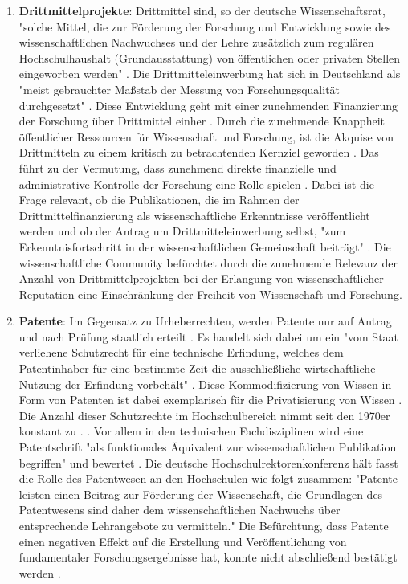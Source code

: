 \begin{enumerate}
\item \textbf{Drittmittelprojekte}: Drittmittel sind, so der deutsche Wissenschaftsrat, "solche Mittel, die zur Förderung der Forschung und Entwicklung sowie des wissenschaftlichen Nachwuchses und der Lehre zusätzlich zum regulären Hochschulhaushalt (Grundausstattung) von öffentlichen oder privaten Stellen eingeworben werden" \cite{wr_2014}. Die Drittmitteleinwerbung hat sich in Deutschland als "meist gebrauchter Maßstab der Messung von Forschungsqualität durchgesetzt" \cite{M_nch_2006}. Diese Entwicklung geht mit einer zunehmenden Finanzierung der Forschung über Drittmittel einher \cite{Neidhardt_2010} \cite{Jansen_2007} \cite{simon_2009_wissenschaft_governance}. Durch die zunehmende Knappheit öffentlicher Ressourcen für Wissenschaft und Forschung, ist die Akquise von Drittmitteln zu einem kritisch zu betrachtenden Kernziel geworden \cite{Jansen_2007}. Das führt zu der Vermutung, dass zunehmend direkte finanzielle und administrative Kontrolle der Forschung eine Rolle spielen \cite{Barl_sius_2008}. Dabei ist die Frage relevant, ob die Publikationen, die im Rahmen der Drittmittelfinanzierung als wissenschaftliche Erkenntnisse veröffentlicht werden und ob der Antrag um Drittmitteleinwerbung selbst, "zum Erkenntnisfortschritt in der wissenschaftlichen Gemeinschaft beiträgt" \cite{M_nch_2006}. Die wissenschaftliche Community befürchtet durch die zunehmende Relevanz der Anzahl von Drittmittelprojekten bei der Erlangung von wissenschaftlicher Reputation eine Einschränkung der Freiheit von Wissenschaft und Forschung.
\item \textbf{Patente}: Im Gegensatz zu Urheberrechten, werden Patente nur auf Antrag und nach Prüfung staatlich erteilt \cite[:152]{troy_2012_wissen}. Es handelt sich dabei um ein "vom Staat verliehene Schutzrecht für eine technische Erfindung, welches dem Patentinhaber für eine bestimmte Zeit die ausschließliche wirtschaftliche Nutzung der Erfindung vorbehält" \cite{greif_2003_patente}. Diese Kommodifizierung von Wissen in Form von Patenten ist dabei exemplarisch für die Privatisierung von Wissen \cite[:152]{troy_2012_wissen}. Die Anzahl dieser Schutzrechte im Hochschulbereich nimmt seit den 1970er konstant zu \cite[:168]{troy_2012_wissen}. \cite{schmoch_2003_hochschulforschung} \cite{Fabrizio_2008}. Vor allem in den technischen Fachdisziplinen wird eine Patentschrift "als funktionales Äquivalent zur wissenschaftlichen Publikation begriffen" und bewertet \cite{mersch_2014_patente}. Die deutsche Hochschulrektorenkonferenz hält fasst die Rolle des Patentwesen an den Hochschulen wie folgt zusammen: "Patente leisten einen Beitrag zur Förderung der Wissenschaft, die Grundlagen des Patentwesens sind daher dem wissenschaftlichen Nachwuchs über entsprechende Lehrangebote zu vermitteln." \cite{suchen-Position-HRK} Die Befürchtung, dass Patente einen negativen Effekt auf die Erstellung und Veröffentlichung von fundamentaler Forschungsergebnisse hat, konnte nicht abschließend bestätigt werden \cite{Fabrizio_2008}.

\end{enumerate}
